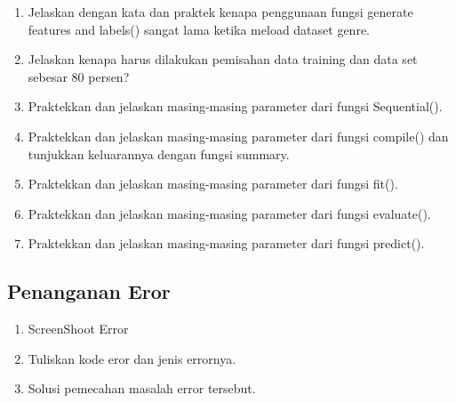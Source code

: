 \begin{enumerate}
\item Jelaskan dengan kata dan praktek kenapa penggunaan fungsi generate features and labels() sangat lama ketika meload dataset genre.
\item Jelaskan kenapa harus dilakukan pemisahan data training dan data set sebesar 80 persen?
\item Praktekkan dan jelaskan masing-masing parameter dari fungsi Sequential().
\item Praktekkan dan jelaskan masing-masing parameter dari fungsi compile() dan tunjukkan keluarannya dengan fungsi summary.
\item Praktekkan dan jelaskan masing-masing parameter dari fungsi fit().
\item Praktekkan dan jelaskan masing-masing parameter dari fungsi evaluate().
\item Praktekkan dan jelaskan masing-masing parameter dari fungsi predict(). 
\end{enumerate}

\subsection{Penanganan Eror}
\begin{enumerate}
\item ScreenShoot Error
\item Tuliskan kode eror dan jenis errornya.
\item Solusi pemecahan masalah error tersebut.
\end{enumerate}

